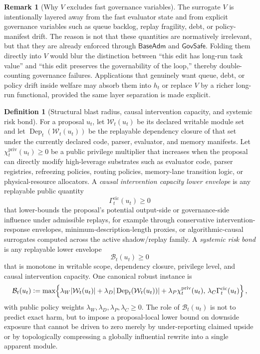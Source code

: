 \documentclass[11pt]{article}
\theoremstyle{definition}
\newtheorem{definition}[theorem]{Definition}
\newtheorem{remark}[theorem]{Remark}
\newcommand{\1}{\mathbf{1}}
\newcommand{\Defeq}{\vcentcolon=}
\begin{document}
\begin{remark}[Why $V$ excludes fast governance variables]\label{rem:V_layering}
The surrogate $V$ is intentionally layered away from the fast evaluator state and from explicit governance variables such as queue backlog, replay fragility, debt, or policy-manifest drift. The reason is not that these quantities are normatively irrelevant, but that they are already enforced through $\mathsf{BaseAdm}$ and $\mathsf{GovSafe}$. Folding them directly into $V$ would blur the distinction between ``this edit has long-run task value'' and ``this edit preserves the governability of the loop,'' thereby double-counting governance failures. Applications that genuinely want queue, debt, or policy drift inside welfare may absorb them into $h_t$ or replace $V$ by a richer long-run functional, provided the same layer separation is made explicit.
\end{remark}

\begin{definition}[Structural blast radius, causal intervention capacity, and systemic risk bond]\label{def:blast_radius}
For a proposal $u_t$, let $\mathcal W_t(u_t)$ be its declared writable module set and let $\operatorname{Dep}_t(\mathcal W_t(u_t))$ be the replayable dependency closure of that set under the currently declared code, parser, evaluator, and memory manifests. Let $\chi_t^{\mathrm{priv}}(u_t)\ge 0$ be a public privilege multiplier that increases when the proposal can directly modify high-leverage substrates such as evaluator code, parser registries, refreezing policies, routing policies, memory-lane transition logic, or physical-resource allocators. A \emph{causal intervention capacity lower envelope} is any replayable public quantity
\[
\Gamma_t^{\mathrm{cic}}(u_t)\ge 0
\]
that lower-bounds the proposal's potential output-side or governance-side influence under admissible replays, for example through conservative intervention-response envelopes, minimum-description-length proxies, or algorithmic-causal surrogates computed across the active shadow/replay family. A \emph{systemic risk bond} is any replayable lower envelope
\[
\mathcal B_t(u_t)\ge 0
\]
that is monotone in writable scope, dependency closure, privilege level, and causal intervention capacity. One canonical robust instance is
\[
\mathcal B_t(u_t)
\Defeq
\max\!\left\{
\lambda_W |\mathcal W_t(u_t)|
+\lambda_D |\operatorname{Dep}_t(\mathcal W_t(u_t))|
+\lambda_P \chi_t^{\mathrm{priv}}(u_t),\,
\lambda_C \Gamma_t^{\mathrm{cic}}(u_t)
\right\},
\]
with public policy weights $\lambda_W,\lambda_D,\lambda_P,\lambda_C\ge 0$. The role of $\mathcal B_t(u_t)$ is not to predict exact harm, but to impose a proposal-local lower bound on downside exposure that cannot be driven to zero merely by under-reporting claimed upside or by topologically compressing a globally influential rewrite into a single apparent module.
\end{definition}
\end{document}
